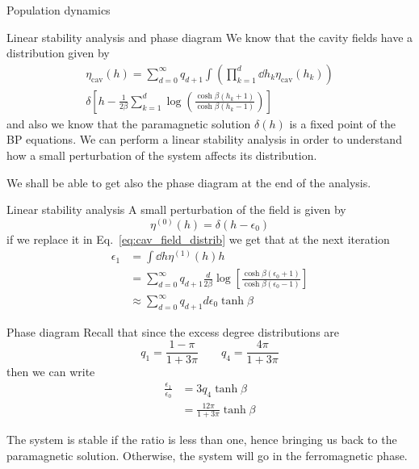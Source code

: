 \documentclass[handout]{beamer}
\begin{document}
\begin{frame}{Population dynamics}
\end{frame}

\begin{frame}{Linear stability analysis and phase diagram}
    We know that the cavity fields have a distribution given by
    \begin{multline}
        \eta_{\text{cav}}(h) =
        \sum_{d=0}^{\infty} q_{d+1}
        \int \left( \prod_{k=1}^d \dd{h_k} \eta_{\text{cav}} (h_k) \right) \\
        \delta \left[ h - \frac{1}{2\beta} \sum_{k=1}^d
            \log\left( \frac{\cosh{\beta(h_k+1)}}{\cosh{\beta(h_k-1)}} \right)
        \right]
        \label{eq:cav_field_distrib}
    \end{multline}
    and also we know that the paramagnetic solution $\delta(h)$ is a
    \alert{fixed point} of the BP equations. We can perform a \alert{linear
    stability analysis} in order to understand how a small perturbation of the
    system affects its distribution.

    We shall be able to get also the phase diagram at the end of the analysis.
\end{frame}

\begin{frame}{Linear stability analysis}
    A small perturbation of the field is given by
    \begin{equation}
        \eta^{(0)} (h) = \delta(h-\epsilon_0)
    \end{equation}
    if we replace it in Eq.~\ref{eq:cav_field_distrib} we get that at the next
    iteration
    \begin{align}
        \epsilon_1 &= \int \dd{h} \eta^{(1)}(h) h\\
                   &= \sum_{d=0}^{\infty} q_{d+1} \frac{d}{2\beta} \log \left[
                       \frac{\cosh{\beta(\epsilon_0+1)}}{\cosh{\beta(\epsilon_0-1)}}
                   \right]\\
                   &\approx \sum_{d=0}^{\infty} q_{d+1} d \epsilon_0
                   \tanh{\beta}
    \end{align}
\end{frame}

\begin{frame}{Phase diagram}
    Recall that since the excess degree distributions are
    $$
    q_1 = \frac{1-\pi}{1+3\pi} \qquad q_4 = \frac{4\pi}{1+3\pi}
    $$
    then we can write
    \begin{align}
        \frac{\epsilon_1}{\epsilon_0} &= 3q_4 \tanh{\beta}\\
                                      &= \frac{12\pi}{1+3\pi} \tanh{\beta}
    \end{align}

    The system is \alert{stable} if the ratio is less than one, hence bringing
    us back to the \alert{paramagnetic} solution. Otherwise, the system will go
    in the ferromagnetic phase.

\end{frame}
\end{document}
